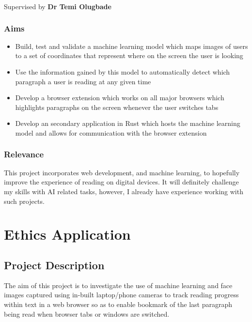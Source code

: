 \documentclass[twocolumn]{report}
\begin{document}
\vspace{0.5cm}

\noindent
Supervised by \textbf{Dr Temi Olugbade} 

\vspace{0.5cm}

\subsection*{Aims}

\begin{itemize}
    \item Build, test and validate a machine learning model which maps images of users to a set of coordinates that represent where on the screen the user is looking 
    \item Use the information gained by this model to automatically detect which paragraph a user is reading at any given time 
    \item Develop a browser extension which works on all major browsers which highlights paragraphs on the screen whenever the user switches tabs 
    \item Develop an secondary application in Rust which hosts the machine learning model and allows for communication with the browser extension 
\end{itemize}

\subsection*{Relevance}

This project incorporates web development, and machine learning, to hopefully improve the experience of reading on digital devices. It will definitely challenge my skills with AI related tasks, however, I already have experience working with such projects. 

\chapter{Ethics Application}\label{sec:ethics-app}

\section*{Project Description}

The aim of this project is to investigate the use of machine learning and face images captured using in-built laptop/phone cameras to track reading progress within text in a web browser so as to enable bookmark of the last paragraph being read when browser tabs or windows are switched.
\end{document}
